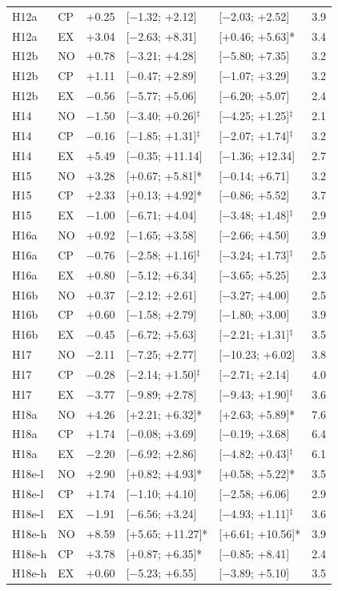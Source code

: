 \begin{table}[H]
\begin{tabular}{@{}llrllr@{}}
H12a & CP & +0.25 & [$-$1.32; +2.12] & [$-$2.03; +2.52] & 3.9 \\
H12a & EX & +3.04 & [$-$2.63; +8.31] & [+0.46; +5.63]* & 3.4 \\
H12b & NO & +0.78 & [$-$3.21; +4.28] & [$-$5.80; +7.35] & 3.2 \\
H12b & CP & +1.11 & [$-$0.47; +2.89] & [$-$1.07; +3.29] & 3.2 \\
H12b & EX & $-$0.56 & [$-$5.77; +5.06] & [$-$6.20; +5.07] & 2.4 \\
H14 & NO & $-$1.50 & [$-$3.40; +0.26]$^\ddagger$ & [$-$4.25; +1.25]$^\ddagger$ & 2.1 \\
H14 & CP & $-$0.16 & [$-$1.85; +1.31]$^\ddagger$ & [$-$2.07; +1.74]$^\ddagger$ & 3.2 \\
H14 & EX & +5.49 & [$-$0.35; +11.14] & [$-$1.36; +12.34] & 2.7 \\
H15 & NO & +3.28 & [+0.67; +5.81]* & [$-$0.14; +6.71] & 3.2 \\
H15 & CP & +2.33 & [+0.13; +4.92]* & [$-$0.86; +5.52] & 3.7 \\
H15 & EX & $-$1.00 & [$-$6.71; +4.04] & [$-$3.48; +1.48]$^\ddagger$ & 2.9 \\
H16a & NO & +0.92 & [$-$1.65; +3.58] & [$-$2.66; +4.50] & 3.9 \\
H16a & CP & $-$0.76 & [$-$2.58; +1.16]$^\ddagger$ & [$-$3.24; +1.73]$^\ddagger$ & 2.5 \\
H16a & EX & +0.80 & [$-$5.12; +6.34] & [$-$3.65; +5.25] & 2.3 \\
H16b & NO & +0.37 & [$-$2.12; +2.61] & [$-$3.27; +4.00] & 2.5 \\
H16b & CP & +0.60 & [$-$1.58; +2.79] & [$-$1.80; +3.00] & 3.9 \\
H16b & EX & $-$0.45 & [$-$6.72; +5.63] & [$-$2.21; +1.31]$^\ddagger$ & 3.5 \\
H17 & NO & $-$2.11 & [$-$7.25; +2.77] & [$-$10.23; +6.02] & 3.8 \\
H17 & CP & $-$0.28 & [$-$2.14; +1.50]$^\ddagger$ & [$-$2.71; +2.14] & 4.0 \\
H17 & EX & $-$3.77 & [$-$9.89; +2.78] & [$-$9.43; +1.90]$^\ddagger$ & 3.6 \\
H18a & NO & +4.26 & [+2.21; +6.32]* & [+2.63; +5.89]* & 7.6 \\
H18a & CP & +1.74 & [$-$0.08; +3.69] & [$-$0.19; +3.68] & 6.4 \\
H18a & EX & $-$2.20 & [$-$6.92; +2.86] & [$-$4.82; +0.43]$^\ddagger$ & 6.1 \\
\midrule
H18e-l & NO & +2.90 & [+0.82; +4.93]* & [+0.58; +5.22]* & 3.5 \\
H18e-l & CP & +1.74 & [$-$1.10; +4.10] & [$-$2.58; +6.06] & 2.9 \\
H18e-l & EX & $-$1.91 & [$-$6.56; +3.24] & [$-$4.93; +1.11]$^\ddagger$ & 3.6 \\
H18e-h & NO & +8.59 & [+5.65; +11.27]* & [+6.61; +10.56]* & 3.9 \\
H18e-h & CP & +3.78 & [+0.87; +6.35]* & [$-$0.85; +8.41] & 2.4 \\
H18e-h & EX & +0.60 & [$-$5.23; +6.55] & [$-$3.89; +5.10] & 3.5 \\
\bottomrule\end{tabular}\end{table}
